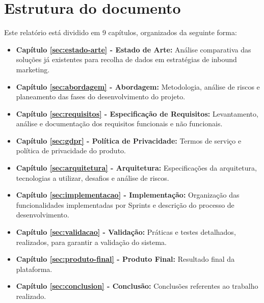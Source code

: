 \section{Estrutura do documento}
\label{subsec:estrutura}

Este relatório está dividido em 9 capítulos, organizados da seguinte forma:
\begin{itemize}
	 \item \textbf{Capítulo \ref{sec:estado-arte} - Estado de Arte: }Análise comparativa das soluções já existentes para recolha de dados em estratégias de inbound marketing.
	
	\item \textbf{Capítulo \ref{sec:abordagem} - Abordagem: }Metodologia, análise de riscos e planeamento das fases do desenvolvimento do projeto.
	
	\item \textbf{Capítulo \ref{sec:requisitos} - Especificação de Requisitos: }Levantamento, análise e documentação dos requisitos funcionais e não funcionais.
	
	\item \textbf{Capítulo \ref{sec:gdpr} - Política de Privacidade: }Termos de serviço e política de privacidade do produto.
	
	\item \textbf{Capítulo \ref{sec:arquitetura} - Arquitetura: }Especificações da arquitetura, tecnologias a utilizar, desafios e análise de riscos.
	
	
	\item \textbf{Capítulo \ref{sec:implementacao} - Implementação: }Organização das funcionalidades implementadas por Sprints e descrição do processo de desenvolvimento.
	
	\item \textbf{Capítulo \ref{sec:validacao} - Validação: }Práticas e testes detalhados, realizados, para garantir a validação do sistema.
	
	\item \textbf{Capítulo \ref{sec:produto-final} - Produto Final: }Resultado final da plataforma.

	\item \textbf{Capítulo \ref{sec:conclusion} - Conclusão: }Conclusões referentes ao trabalho realizado.
	
\end{itemize}



\blankpage

\glsresetall



